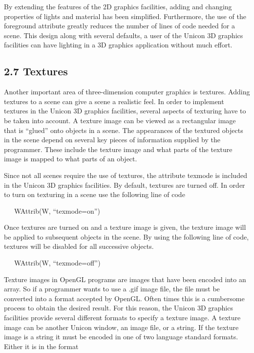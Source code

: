 \documentclass[letterpaper]{article}
\begin{document}
{
By extending the features of the 2D graphics facilities, adding and changing properties of lights and material has been
simplified. Furthermore, the use of the foreground attribute greatly reduces the number of lines of code needed for a
scene. This design along with several defaults, a user of the Unicon 3D graphics facilities can have lighting in a 3D
graphics application without much effort. }


\subsection[2.7 Textures]{2.7 Textures}

Another important area of three-dimension computer graphics is
textures. Adding textures to a scene can give a scene a realistic
feel. In order to implement textures in the Unicon 3D graphics
facilities, several aspects of texturing have to be taken into
account. A texture image can be viewed as a rectangular image that is
``glued'' onto objects in a scene. The appearances of the textured
objects in the scene depend on several key pieces of information
supplied by the programmer. These include the texture image and what
parts of the texture image is mapped to what parts of an object.

Since not all scenes require the use of textures, the attribute
\textsf{texmode} is included in the Unicon 3D graphics facilities. By
default, textures are turned off. In order to turn on texturing in a
scene use the following line of code

{\ttfamily
\ \ \ \textsf{WAttrib(W, ``texmode=on'')} }

Once textures are turned on and a texture image is given, the texture
image will be applied to subsequent objects in the scene. By using the
following line of code, textures will be disabled for all successive
objects.

{\ttfamily
\ \ \ \textsf{WAttrib(W, ``texmode=off'')}}

{
Texture images in OpenGL programs are images that have been encoded into an array. So if a programmer wants to use a
.gif image file, the file must be converted into a format accepted by OpenGL. Often times this is a cumbersome process
to obtain the desired result. For this reason, the Unicon 3D graphics facilities provide several different formats to
specify a texture image. A texture image can be another Unicon window, an image file, or a string. If the texture image
is a string it must be encoded in one of two language standard formats. Either it is in the format }
\end{document}
